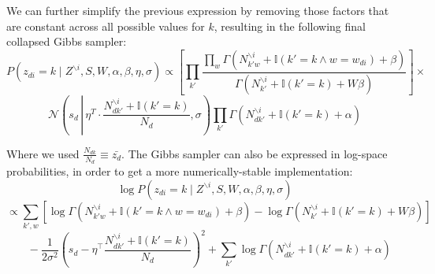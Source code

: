 \documentclass[a4paper,10pt]{article}
\begin{document}
We can further simplify the previous expression by removing those factors that are constant across all possible values for $k$, resulting in the following final collapsed Gibbs sampler:
\[P(z_{di} = k \mid Z^{\backslash{i}}, S, W, \alpha, \beta, \eta, \sigma) \propto \left[ \prod_{k'} \frac{\prod_w \Gamma(N_{{k'}w}^{\backslash i} + \mathbb{I}(k' = k \wedge w = w_{di}) + \beta)}{\Gamma(N_{k'}^{\backslash i} + \mathbb{I}(k' = k) + W \beta)} \right] \times \]
\begin{equation}
\mathcal{N}\left(s_d\, \left|\, \eta^T \cdot \frac{N_{d{k'}}^{\backslash i} + \mathbb{I}(k' = k)}{N_d}, \sigma\right. \right) \prod_{k'} \Gamma(N_{d{k'}}^{\backslash i} + \mathbb{I}(k' = k) + \alpha)
\end{equation}

Where we used $ \frac{N_{dk}}{N_d} \equiv \bar{z_d} $. 
The Gibbs sampler can also be expressed in log-space probabilities, in order to get a more numerically-stable implementation:
\[ \log P(z_{di} = k \mid Z^{\backslash{i}}, S, W, \alpha, \beta, \eta, \sigma)  \]
\[ \propto\sum_{k',w} \left[ \log \Gamma(N_{{k'}w}^{\backslash i} + \mathbb{I}(k' = k \wedge w = w_{di}) + \beta) - \log \Gamma(N_{k'}^{\backslash i} + \mathbb{I}(k' = k) + W \beta) \right] \]
\[ \hspace{10pt}-\frac{1}{2 \sigma^2}\left(s_d - \eta^\top \frac{N_{d{k'}}^{\backslash i} + \mathbb{I}(k' = k)}{N_d}\right)^2 + \sum_{k'} \log \Gamma(N_{d{k'}}^{\backslash i} + \mathbb{I}(k' = k) + \alpha) \]
\end{document}
